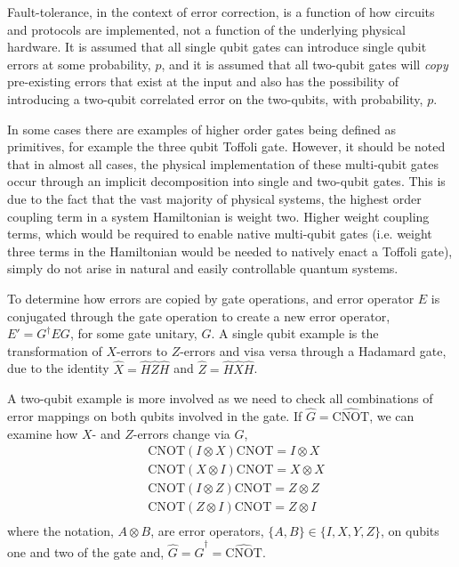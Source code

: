 Fault-tolerance, in the context of error correction, is a function of how circuits and protocols are implemented, not a function of the underlying physical hardware.  It is assumed that all single qubit gates can introduce single qubit errors at some probability, $p$, and it is assumed that all two-qubit gates will {\it copy} pre-existing errors that exist at the input and also has the possibility of introducing a two-qubit correlated error on the two-qubits, with probability, $p$.  

In some cases there are examples of higher order gates being defined as primitives, for example the three qubit Toffoli gate.  However, it should be noted that in almost all cases, the physical implementation of these multi-qubit gates occur through an implicit decomposition into single and two-qubit gates.  This is due to the fact that the vast majority of physical systems, the highest order coupling term in a system Hamiltonian is weight two.  Higher weight coupling terms, which would be required to enable native multi-qubit gates (i.e. weight three terms in the Hamiltonian would be needed to natively enact a Toffoli gate), simply do not arise in natural and easily controllable quantum systems.  

To determine how errors are copied by gate operations, and error operator $E$ is conjugated through the gate operation to create a new error operator, $E' = G^{\dagger}EG$, for some gate unitary, $G$.  A single qubit example is the transformation of $X$-errors to $Z$-errors and visa versa through a Hadamard gate, due to the identity $\hat{X} = \hat{H}\hat{Z}\hat{H}$ and $\hat{Z} = \hat{H}\hat{X}\hat{H}$.  

A two-qubit example is more involved as we need to check all combinations of error mappings on both qubits involved in the gate.  If $\hat{G} = \hat{\mathrm{CNOT}}$, we can examine how $X$- and $Z$-errors change via $G$,
\begin{equation}
\begin{aligned}
&\mathrm{CNOT} (I\otimes X) \mathrm{CNOT} = I \otimes X \\
&\mathrm{CNOT} (X\otimes I) \mathrm{CNOT} = X \otimes X \\
&\mathrm{CNOT} (I\otimes Z) \mathrm{CNOT} = Z \otimes Z \\
&\mathrm{CNOT} (Z\otimes I) \mathrm{CNOT} = Z \otimes I \\
\end{aligned}
\end{equation}
where the notation, $A \otimes B$, are error operators, $\{A,B\} \in \{I,X,Y,Z\}$, on qubits one and two of the gate and, 
$\hat{G} = \hat{G}^{\dagger} = \hat{\mathrm{CNOT}}$.

